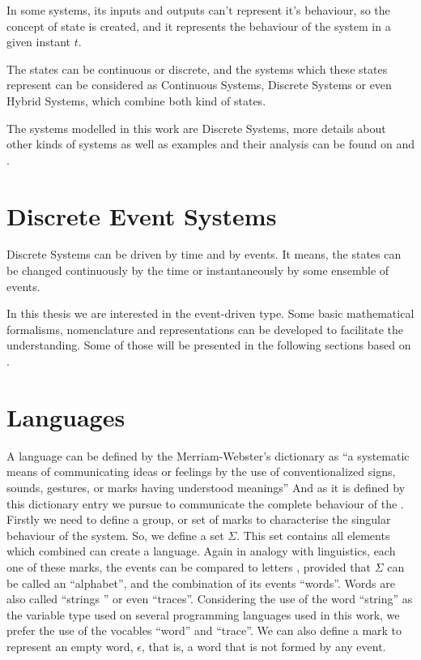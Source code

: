 In some systems, its inputs and outputs can't represent it's behaviour, so the
concept of state is created, and it represents the behaviour of the system in a
given instant $t$.

The states can be continuous or discrete, and the systems which these states
represent can be considered as Continuous Systems, Discrete Systems or even
Hybrid Systems, which combine both kind of states.

The systems modelled in this work are Discrete Systems, more details about other
kinds of systems as well as examples and their analysis can be found on
\cite{oppenheim1996signals} and \cite{kalouptsidis1997signal}.
\section{Discrete Event Systems}
\label{sec:discreteEventSystems}
Discrete Systems can be driven by time and by events. It means, the states can
be changed continuously by the time or instantaneously by some ensemble of events.

In this thesis we are interested in the event-driven type. Some basic mathematical
formalisms, nomenclature and representations can be developed to facilitate the
understanding. Some of those will be presented in the following sections based
on \cite{cassandras2009introduction, david2005discrete,david1989grafcet}.
\section{Languages}
\label{sec:automata}
A language can be defined by the Merriam-Webster's dictionary as ``a systematic
means of communicating ideas or feelings by the use of conventionalized signs,
sounds, gestures, or marks having understood meanings'' And as it is defined by
this dictionary entry we pursue to communicate the complete behaviour of the
\DES. Firstly we need to define a group, or set of marks to characterise the
singular behaviour of the system. So, we define a set $\Sigma$. This set contains
all elements which combined can create a language. Again in analogy with
linguistics, each one of these marks, the events can be compared to letters ,
provided that $\Sigma$ can be called an ``alphabet'', and the combination of its
events ``words''. Words are also called ``strings '' or even ``traces''.
Considering the use of the word ``string'' as the variable type used on several
programming languages used in this work, we prefer the use of the vocables
``word'' and ``trace''. We can also define a mark to represent an empty word,
$\epsilon$, that is, a word that is not formed by any event.

